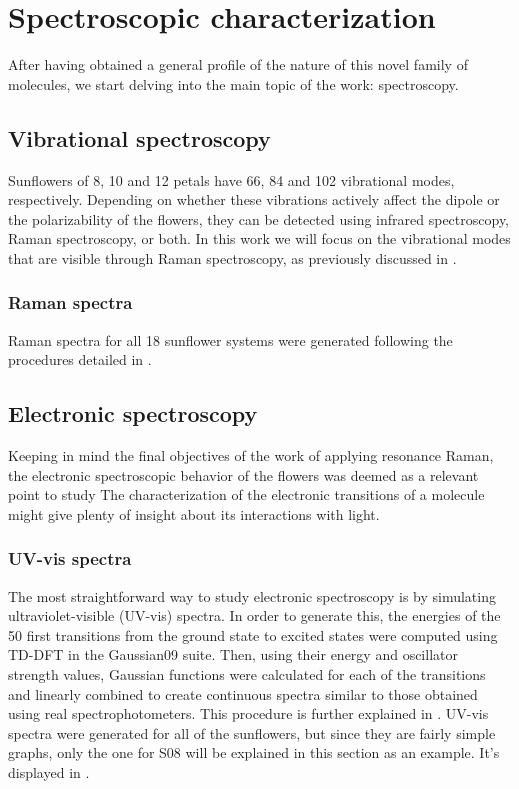 \section{Spectroscopic characterization}
After having obtained a general profile of the nature of this novel family of molecules, we start delving into the main topic of the work: spectroscopy.


\subsection{Vibrational spectroscopy}
Sunflowers of 8, 10 and 12 petals have 66, 84 and 102 vibrational modes, respectively.
Depending on whether these vibrations actively affect the dipole or the polarizability of the flowers, they can be detected using infrared spectroscopy, Raman spectroscopy, or both.
In this work we will focus on the vibrational modes that are visible through Raman spectroscopy, as previously discussed in .

\subsubsection{Raman spectra}
Raman spectra for all 18 sunflower systems were generated following the procedures detailed in .


\subsection{Electronic spectroscopy}
Keeping in mind the final objectives of the work of applying resonance Raman, the electronic spectroscopic behavior of the flowers was deemed as a relevant point to study
The characterization of the electronic transitions of a molecule might give plenty of insight about its interactions with light.

\subsubsection{UV-vis spectra}
The most straightforward way to study electronic spectroscopy is by simulating ultraviolet-visible (UV-vis) spectra.
In order to generate this, the energies of the 50 first transitions from the ground state to excited states were computed using TD-DFT in the Gaussian09 suite.
Then, using their energy and oscillator strength values, Gaussian functions were calculated for each of the transitions and linearly combined to create continuous spectra similar to those obtained using real spectrophotometers.
This procedure is further explained in .
UV-vis spectra were generated for all of the sunflowers, but since they are fairly simple graphs, only the one for S08 will be explained in this section as an example.
It's displayed in .

